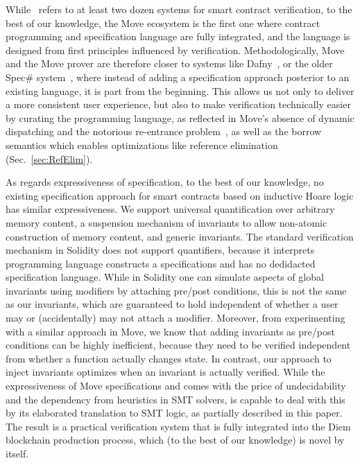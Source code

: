 While~\cite{CONTRACT_VERIFICATION} refers to at least two dozen systems for
smart contract verification, to the best of our knowledge, the Move ecosystem is
the first one where contract programming and specification language are fully
integrated, and the language is designed from first principles influenced by
verification. Methodologically, Move and the Move prover are therefore closer to
systems like Dafny~\cite{DAFNY}, or the older Spec\# system~\cite{SPECSHARP},
where instead of adding a specification approach posterior to an existing
language, it is part from the beginning. This allows us not only to deliver a
more consistent user experience, but also to make verification technically
easier by curating the programming language, as reflected in Move's absence of
dynamic dispatching and the notorious re-entrance problem~\cite{REENTRANCE}, as
well as the borrow semantics which enables optimizations like reference
elimination (Sec.~\ref{sec:RefElim}).

As regards expressiveness of specification, to the best of our knowledge, no
existing specification approach for smart contracts based on inductive Hoare
logic has similar expressiveness. We support universal quantification over
arbitrary memory content, a suspension mechanism of invariants to allow
non-atomic construction of memory content, and generic invariants. The standard
verification mechanism in Solidity does not support quantifiers, because it
interprets programming language constructs a specifications and has no
dedidacted specification language. While in Solidity one can simulate aspects of
global invariants using modifiers by attaching pre/post conditions, this is not
the same as our invariants, which are guaranteed to hold independent of whether
a user may or (accidentally) may not attach a modifier.  Moreover, from
experimenting with a similar approach in Move, we know that adding invariants as
pre/post conditions can be highly inefficient, because they need to be verified
independent from whether a function actually changes state. In contrast, our
approach to inject invariants optimizes when an invariant is actually verified.
While the expressiveness of Move specifications and \MVP comes with the price of
undecidability and the dependency from heuristics in SMT solvers, \MVP is
capable to deal with this by its elaborated translation to SMT logic, as
partially described in this paper. The result is a practical verification system
that is fully integrated into the Diem blockchain production process, which (to
the best of our knowledge) is novel by itself.

